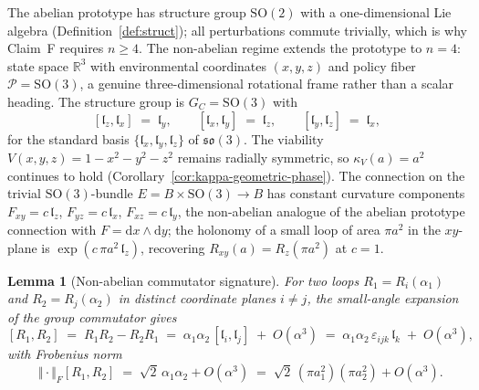 \documentclass[11pt,a4paper]{article}
\theoremstyle{plain}
\newtheorem{lemma}[theorem]{Lemma}
\theoremstyle{definition}
\theoremstyle{remark}
\newcommand{\kk}{\kappa_{\!V}}
\newcommand{\RR}{\mathbb{R}}
\newcommand{\SO}{\mathrm{SO}}
\newcommand{\so}{\mathfrak{so}}
\newcommand{\Frob}{\!\operatorname{}\!\mathopen{}\Vert\cdot\mathclose{}\Vert_{\!F}}
\begin{document}
The abelian prototype has structure group $\SO(2)$ with a
one-dimensional Lie algebra (Definition~\ref{def:struct}); all
perturbations commute trivially, which is why Claim~F requires
$n\geq4$. The non-abelian regime extends the prototype to $n=4$:
state space $\RR^{3}$ with environmental coordinates $(x,y,z)$ and
policy fiber $\mathcal{P}=\SO(3)$, a genuine three-dimensional
rotational frame rather than a scalar heading. The structure group
is $G_{C}=\SO(3)$ with
\begin{equation}\label{eq:so3comm}
  [\mathfrak{l}_z, \mathfrak{l}_x] \;=\; \mathfrak{l}_y,\qquad
  [\mathfrak{l}_x, \mathfrak{l}_y] \;=\; \mathfrak{l}_z,\qquad
  [\mathfrak{l}_y, \mathfrak{l}_z] \;=\; \mathfrak{l}_x,
\end{equation}
for the standard basis
$\{\mathfrak{l}_x,\mathfrak{l}_y,\mathfrak{l}_z\}$ of $\so(3)$. The
viability $V(x,y,z)=1-x^{2}-y^{2}-z^{2}$ remains radially
symmetric, so $\kk(a)=a^{2}$ continues to hold
(Corollary~\ref{cor:kappa-geometric-phase}). The connection on the
trivial $\SO(3)$-bundle $E=B\times\SO(3)\to B$ has constant
curvature components $F_{xy}=c\,\mathfrak{l}_z$,
$F_{yz}=c\,\mathfrak{l}_x$, $F_{xz}=c\,\mathfrak{l}_y$, the
non-abelian analogue of the abelian prototype connection with
$F=\mathrm{d}x\wedge\mathrm{d}y$; the holonomy of a small loop of
area $\pi a^{2}$ in the $xy$-plane is
$\exp(c\,\pi a^{2}\,\mathfrak{l}_z)$, recovering
$R_{xy}(a)=R_{z}(\pi a^{2})$ at $c=1$.

\begin{lemma}[Non-abelian commutator signature]\label{lem:comm}
For two loops $R_1=R_i(\alpha_1)$ and $R_2=R_j(\alpha_2)$ in
distinct coordinate planes $i\neq j$, the small-angle expansion of
the group commutator gives
\begin{equation}\label{eq:comm}
  [R_1, R_2] \;=\; R_1 R_2 - R_2 R_1 \;=\;
  \alpha_1\alpha_2\,[\mathfrak{l}_i, \mathfrak{l}_j] \;+\;
  O(\alpha^{3}) \;=\;
  \alpha_1\alpha_2\,\varepsilon_{ijk}\,\mathfrak{l}_k \;+\;
  O(\alpha^{3}),
\end{equation}
with Frobenius norm
\begin{equation}\label{eq:norm}
  \Frob{[R_1,R_2]} \;=\; \sqrt{2}\,\alpha_1\alpha_2 + O(\alpha^{3})
  \;=\; \sqrt{2}\,(\pi a_1^{2})(\pi a_2^{2}) + O(\alpha^{3}).
\end{equation}
\end{lemma}
\end{document}

